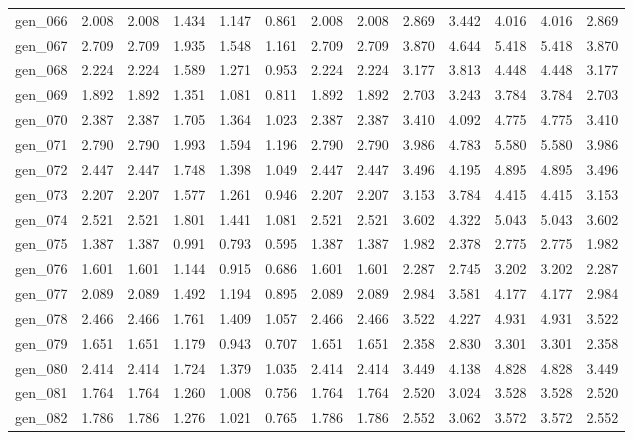 \begin{tabular}{lrrrrrrrrrrrr}
gen\_066 &  2.008 &  2.008 &  1.434 &  1.147 &  0.861 &  2.008 &  2.008 &  2.869 &  3.442 &  4.016 &  4.016 &  2.869 \\
gen\_067 &  2.709 &  2.709 &  1.935 &  1.548 &  1.161 &  2.709 &  2.709 &  3.870 &  4.644 &  5.418 &  5.418 &  3.870 \\
gen\_068 &  2.224 &  2.224 &  1.589 &  1.271 &  0.953 &  2.224 &  2.224 &  3.177 &  3.813 &  4.448 &  4.448 &  3.177 \\
gen\_069 &  1.892 &  1.892 &  1.351 &  1.081 &  0.811 &  1.892 &  1.892 &  2.703 &  3.243 &  3.784 &  3.784 &  2.703 \\
gen\_070 &  2.387 &  2.387 &  1.705 &  1.364 &  1.023 &  2.387 &  2.387 &  3.410 &  4.092 &  4.775 &  4.775 &  3.410 \\
gen\_071 &  2.790 &  2.790 &  1.993 &  1.594 &  1.196 &  2.790 &  2.790 &  3.986 &  4.783 &  5.580 &  5.580 &  3.986 \\
gen\_072 &  2.447 &  2.447 &  1.748 &  1.398 &  1.049 &  2.447 &  2.447 &  3.496 &  4.195 &  4.895 &  4.895 &  3.496 \\
gen\_073 &  2.207 &  2.207 &  1.577 &  1.261 &  0.946 &  2.207 &  2.207 &  3.153 &  3.784 &  4.415 &  4.415 &  3.153 \\
gen\_074 &  2.521 &  2.521 &  1.801 &  1.441 &  1.081 &  2.521 &  2.521 &  3.602 &  4.322 &  5.043 &  5.043 &  3.602 \\
gen\_075 &  1.387 &  1.387 &  0.991 &  0.793 &  0.595 &  1.387 &  1.387 &  1.982 &  2.378 &  2.775 &  2.775 &  1.982 \\
gen\_076 &  1.601 &  1.601 &  1.144 &  0.915 &  0.686 &  1.601 &  1.601 &  2.287 &  2.745 &  3.202 &  3.202 &  2.287 \\
gen\_077 &  2.089 &  2.089 &  1.492 &  1.194 &  0.895 &  2.089 &  2.089 &  2.984 &  3.581 &  4.177 &  4.177 &  2.984 \\
gen\_078 &  2.466 &  2.466 &  1.761 &  1.409 &  1.057 &  2.466 &  2.466 &  3.522 &  4.227 &  4.931 &  4.931 &  3.522 \\
gen\_079 &  1.651 &  1.651 &  1.179 &  0.943 &  0.707 &  1.651 &  1.651 &  2.358 &  2.830 &  3.301 &  3.301 &  2.358 \\
gen\_080 &  2.414 &  2.414 &  1.724 &  1.379 &  1.035 &  2.414 &  2.414 &  3.449 &  4.138 &  4.828 &  4.828 &  3.449 \\
gen\_081 &  1.764 &  1.764 &  1.260 &  1.008 &  0.756 &  1.764 &  1.764 &  2.520 &  3.024 &  3.528 &  3.528 &  2.520 \\
gen\_082 &  1.786 &  1.786 &  1.276 &  1.021 &  0.765 &  1.786 &  1.786 &  2.552 &  3.062 &  3.572 &  3.572 &  2.552 \\

\end{tabular}
